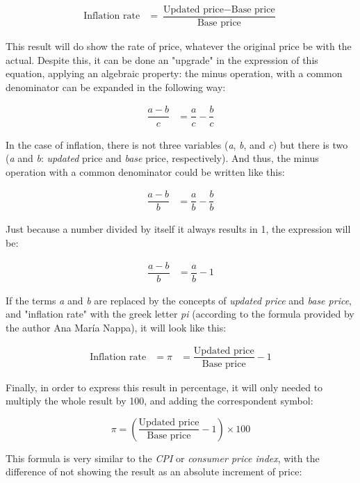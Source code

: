 \documentclass[12pt,a4paper,twoside]{book}
\begin{document}
\begin{align*}
\text{Inflation rate} &= \dfrac{\text{Updated price} - \text{Base price}}{\text{Base price}}
\end{align*}

This result will do show the rate of price, whatever the original price be with the actual. Despite this, it can be done an "upgrade" in the expression of this equation, applying an algebraic property: the minus operation, with a common denominator can be expanded in the following way:

\begin{align*}
\dfrac{a-b}{c} &= \dfrac{a}{c} - \dfrac{b}{c}
\end{align*}

In the case of inflation, there is not three variables (\textit{a}, \textit{b}, and \textit{c}) but there is two (\textit{a} and \textit{b}: \textit{updated} price and \textit{base} price, respectively). And thus, the minus operation with a common denominator could be written like this:

\begin{align*}
\dfrac{a-b}{b} &= \dfrac{a}{b} - \dfrac{b}{b}
\end{align*}

Just because  a number divided by itself it always results in 1, the expression will be:

\begin{align*}
\dfrac{a-b}{b} &= \dfrac{a}{b} - 1
\end{align*}

If the terms \textit{a} and \textit{b} are replaced by the concepts of \textit{updated price} and \textit{base price}, and "inflation rate" with the greek letter \textit{pi} (according to the formula provided by the author Ana María Nappa), it will look like this:

\begin{align*}
\text{Inflation rate} &= \pi &= \dfrac{\text{Updated price}}{\text{Base price}} - 1
\end{align*}

Finally, in order to express this result in percentage, it will only needed to multiply the whole result by 100, and adding the correspondent symbol:

\begin{equation}
\pi = \left( \dfrac{\text{Updated price}}{\text{Base price}} - 1 \right) \times 100
\end{equation}

This formula is very similar to the \textit{CPI} or \textit{consumer price index}, with the difference of not showing the result as an absolute increment of price:
\end{document}
